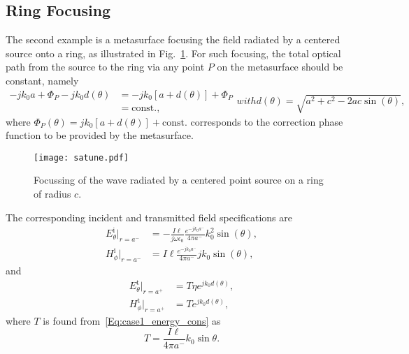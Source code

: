 \documentclass[journal,transaction]{IEEEtran}
\newcommand{\figref}{Fig.~\ref}
\begin{document}
\subsection{Ring Focusing}

The second example is a metasurface focusing the field radiated by a centered source onto a ring, as illustrated in \figref{FIG:satune}. For such focusing, the total optical path from the source to the ring via any point $P$ on the metasurface should be constant, namely
%
\begin{subequations}\label{Eq:phase}
\begin{equation}
\begin{split}
-jk_0a+\Phi_P-jk_0d(\theta)
&=-jk_0[a+d(\theta)]+\Phi_P\\
&=\text{const.},
\end{split}
\end{equation}
with
\begin{equation}
d(\theta)=\sqrt{a^2+c^2-2ac\sin(\theta)},
\end{equation}
\end{subequations}
%
where $\Phi_P(\theta)=jk_0[a+d(\theta)]+\text{const.}$ corresponds to the correction phase function to be provided by the metasurface.

\begin{figure}[!h]
    \centering
         \texttt{[image: satune.pdf]}{
        }
        \caption{Focussing of the wave radiated by a centered point source on a ring of radius $c$.}
   \label{FIG:satune}
\end{figure}

The corresponding incident and transmitted field specifications are
%
\begin{subequations}\label{Eq:saturn_field_in}
\begin{align}
  E_{\theta}^\text{i}|_{r=a^-} & =-\frac{I\ell}{j\omega \epsilon_0}\frac{e^{-jk_0a^-}}{4\pi a^-}k_0^2\sin(\theta),\\
  H_{\phi}^\text{i}|_{r=a^-} & =I\ell\frac{e^{-jk_0a^-}}{4\pi a^-}jk_0\sin(\theta),
\end{align}
\end{subequations}
%
and
%
 \begin{subequations}\label{Eq:saturn_field_out}
\begin{align}
  E_{\theta}^\text{t}|_{r=a^+} & =T\eta e^{jk_0d(\theta)},\\
  H_{\phi}^\text{t}|_{r=a^+} & =Te^{jk_0d(\theta)},
\end{align}
\end{subequations}
%
where $T$ is found from~\eqref{Eq:case1_energy_cons} as
%
\begin{equation}
T=\frac{I\ell}{4\pi a^-}k_0\sin\theta.
\end{equation}
\end{document}
